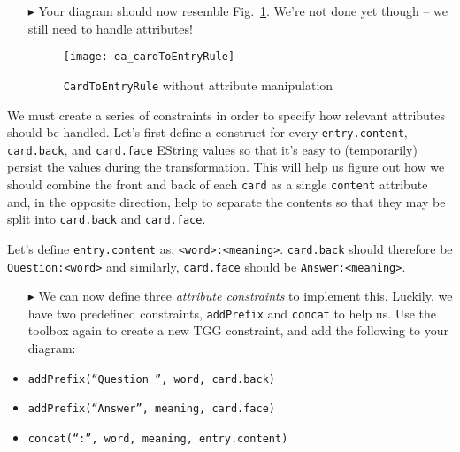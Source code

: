 \begin{enumerate}
\item[$\blacktriangleright$] Your diagram should now resemble Fig.~\ref{ea:cardtoentry_1}. We're not done yet though -- we still need to handle attributes!

\vspace{0.5cm}

  \begin{figure}[htbp]
  \begin{center}
    \texttt{[image: ea\_cardToEntryRule]}
    \caption{\texttt{CardToEntryRule} without attribute manipulation}
    \label{ea:cardtoentry_1}
  \end{center}
  \end{figure}

\end{enumerate}

We must create a series of constraints in order to specify how relevant attributes should be handled. Let's first define a construct for every
\texttt{entry\-.cont\-ent}, \texttt{card.back}, and \texttt{card.face} EString values so that it's easy to (temporarily) persist the values during the
transformation. This will help us figure out how we should combine the front and back of each \texttt{card} as a single \texttt{content} attribute and,
in the opposite direction, help to separate the contents so that they may be split into \texttt{card.back} and \texttt{card.face}.

\vspace{0.5cm}

Let's define \texttt{entry\-.cont\-ent} as: \texttt{<word>:<mean\-ing>}. \texttt{card\-.back} should therefore be \texttt{Quest\-ion:<word>} and
similarly, \texttt{card\-.face} should be \texttt{Ans\-wer:<mean\-ing>}. 

\begin{itemize}

\item[$\blacktriangleright$] We can now define three \emph{attribute constraints} to implement this. Luckily, we have two predefined constraints,
\texttt{addPrefix} and \texttt{concat} to help us. Use the toolbox again to create a new TGG constraint, and add the following to your diagram:

\vspace{0.5cm}

  \item \texttt{addPrefix(``Question '', word, card.back)}  
  
  \item \texttt{addPrefix(``Answer'', meaning, card.face)}
  
  \item \texttt{concat(``:'', word, meaning, entry.content)}

\end{itemize}


